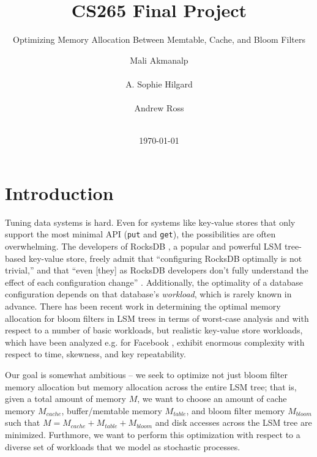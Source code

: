 \documentclass{sig-alternate-05-2015}
\begin{document}
\title{CS265 Final Project}
\subtitle{Optimizing Memory Allocation Between Memtable, Cache, and Bloom Filters}
\author{
\alignauthor
Mali Akmanalp\\
       \\
\alignauthor
A. Sophie Hilgard\\
       \\
\alignauthor Andrew Ross\\
       \\
       }

\date{\today}

\maketitle

\section{Introduction}

Tuning data systems is hard. Even for systems like key-value stores that only
support the most minimal API (\texttt{put} and \texttt{get}), the possibilities
are often overwhelming. The developers of RocksDB \cite{facebook:rocksdb}, a
popular and powerful LSM tree-based key-value store, freely admit that
``configuring RocksDB optimally is not trivial,'' and that ``even [they] as
RocksDB developers don't fully understand the effect of each configuration
change'' \cite{rocksdb-tuning-guide}. Additionally, the optimality of a
database configuration depends on that database's \textit{workload}, which is
rarely known in advance.  There has been recent work \cite{monkey} in
determining the optimal memory allocation for bloom filters in LSM trees in
terms of worst-case analysis and with respect to a number of basic workloads,
but realistic key-value store workloads, which have been analyzed e.g. for
Facebook \cite{characterizing-memcached}, exhibit enormous complexity with
respect to time, skewness, and key repeatability.

Our goal is somewhat ambitious -- we seek to optimize not just bloom filter
memory allocation but memory allocation across the entire LSM tree; that is,
given a total amount of memory $M$, we want to choose an amount of cache memory
$M_{cache}$, buffer/memtable memory $M_{table}$, and bloom filter memory
$M_{bloom}$ such that $M=M_{cache}+M_{table}+M_{bloom}$ and disk accesses
across the LSM tree are minimized. Furthmore, we want to perform this
optimization with respect to a diverse set of workloads that we model as
stochastic processes.
\end{document}
